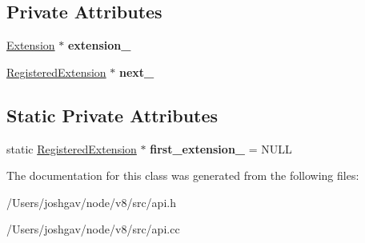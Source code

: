 \subsection*{Private Attributes}
\begin{DoxyCompactItemize}
\item 
\hyperlink{classv8_1_1_extension}{Extension} $\ast$ {\bfseries extension\+\_\+}\hypertarget{classv8_1_1_registered_extension_a8bf8d8c7456e7f6947506ad7d1398224}{}\label{classv8_1_1_registered_extension_a8bf8d8c7456e7f6947506ad7d1398224}

\item 
\hyperlink{classv8_1_1_registered_extension}{Registered\+Extension} $\ast$ {\bfseries next\+\_\+}\hypertarget{classv8_1_1_registered_extension_ae1c54ea4ca2fe872d0f93866e0d4f5f8}{}\label{classv8_1_1_registered_extension_ae1c54ea4ca2fe872d0f93866e0d4f5f8}

\end{DoxyCompactItemize}
\subsection*{Static Private Attributes}
\begin{DoxyCompactItemize}
\item 
static \hyperlink{classv8_1_1_registered_extension}{Registered\+Extension} $\ast$ {\bfseries first\+\_\+extension\+\_\+} = N\+U\+LL\hypertarget{classv8_1_1_registered_extension_ae6e051ea764c26c615d3074a936acb87}{}\label{classv8_1_1_registered_extension_ae6e051ea764c26c615d3074a936acb87}

\end{DoxyCompactItemize}


The documentation for this class was generated from the following files\+:\begin{DoxyCompactItemize}
\item 
/\+Users/joshgav/node/v8/src/api.\+h\item 
/\+Users/joshgav/node/v8/src/api.\+cc\end{DoxyCompactItemize}
